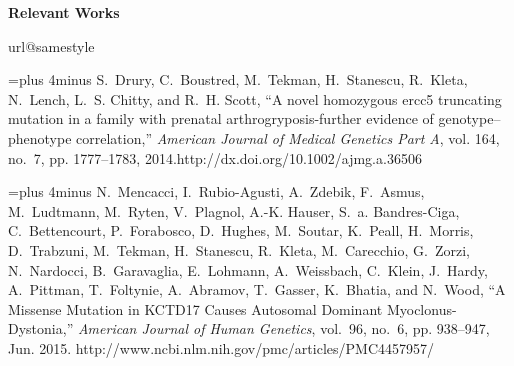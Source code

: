 \pagebreak
{\noindent \bf Relevant Works}\\

\begingroup
\renewcommand{\chapter}[2]{}%
\begin{thebibliography}{10}
\providecommand{\url}[1]{#1}
\csname url@samestyle\endcsname
\providecommand{\newblock}{\relax}
\providecommand{\bibinfo}[2]{#2}
\providecommand{\BIBentrySTDinterwordspacing}{\spaceskip=0pt\relax}
\providecommand{\BIBentryALTinterwordstretchfactor}{4}
\providecommand{\BIBentryALTinterwordspacing}{\spaceskip=\fontdimen2\font plus
\BIBentryALTinterwordstretchfactor\fontdimen3\font minus
  \fontdimen4\font\relax}
\providecommand{\BIBforeignlanguage}[2]{{%
\expandafter\ifx\csname l@#1\endcsname\relax
\typeout{** WARNING: IEEEtran.bst: No hyphenation pattern has been}%
\typeout{** loaded for the language `#1'. Using the pattern for}%
\typeout{** the default language instead.}%
\else
\language=\csname l@#1\endcsname
\fi
#2}}
\providecommand{\BIBdecl}{\relax}

\BIBentryALTinterwordspacing
S.~Drury, C.~Boustred, M.~Tekman, H.~Stanescu, R.~Kleta, N.~Lench, L.~S.
  Chitty, and R.~H. Scott, ``A novel homozygous ercc5 truncating mutation in a
  family with prenatal arthrogryposis-further evidence of genotype–phenotype
  correlation,'' \emph{American Journal of Medical Genetics Part A}, vol. 164,
  no.~7, pp. 1777--1783, 2014.\url{http://dx.doi.org/10.1002/ajmg.a.36506}
\BIBentrySTDinterwordspacing

\BIBentryALTinterwordspacing
N.~Mencacci, I.~Rubio-Agusti, A.~Zdebik, F.~Asmus, M.~Ludtmann, M.~Ryten,
  V.~Plagnol, A.-K. Hauser, S.~a. Bandres-Ciga, C.~Bettencourt, P.~Forabosco,
  D.~Hughes, M.~Soutar, K.~Peall, H.~Morris, D.~Trabzuni, M.~Tekman,
  H.~Stanescu, R.~Kleta, M.~Carecchio, G.~Zorzi, N.~Nardocci, B.~Garavaglia,
  E.~Lohmann, A.~Weissbach, C.~Klein, J.~Hardy, A.~Pittman, T.~Foltynie,
  A.~Abramov, T.~Gasser, K.~Bhatia, and N.~Wood, ``A {Missense} {Mutation} in
  {KCTD}17 {Causes} {Autosomal} {Dominant} {Myoclonus}-{Dystonia},''
  \emph{American Journal of Human Genetics}, vol.~96, no.~6, pp. 938--947, Jun.
  2015.  \url{http://www.ncbi.nlm.nih.gov/pmc/articles/PMC4457957/}
\BIBentrySTDinterwordspacing


\end{thebibliography}
